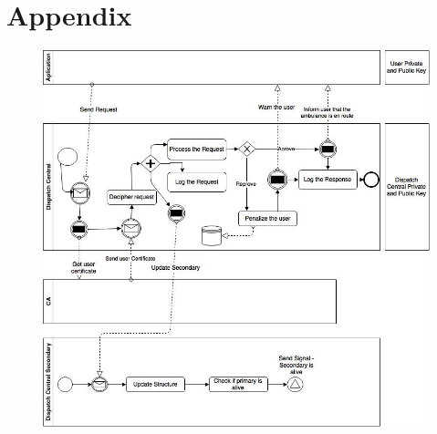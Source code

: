 \documentclass[a4paper,titlepage,11pt]{article}
\begin{document}
\section{Appendix}
\begin{figure}[h]
    \centering
    \includegraphics[scale=0.50]{img/advanced-solution.png}
\end{figure}
\end{document}

